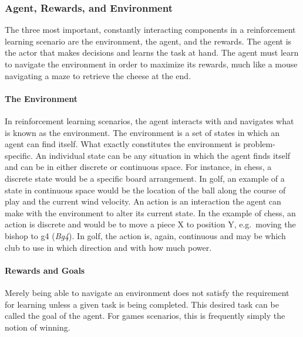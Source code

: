 \subsubsection*{Agent, Rewards, and Environment}


The three most important, constantly interacting components in a reinforcement
learning scenario are
the environment, the agent, and the rewards.
%
The agent is the actor that makes decisions and learns the task at hand.
%
The agent must learn to navigate the environment in order to maximize its
rewards,
much like a mouse navigating a maze to retrieve the cheese at the end.

\paragraph*{The Environment}

In reinforcement learning scenarios,
the agent interacts with and navigates what is known as the environment.
%
The environment is a set of states in which an agent can find itself.
%
What exactly constitutes the environment is problem-specific.
%
An individual state can be any situation in which the agent finds itself
and can be in either discrete or continuous space.
%
For instance, in chess, a discrete state would be a specific board arrangement.
%
In golf, an example of a state in continuous space would be 
the location of the ball along the course of play
and the current wind velocity.
%
An action is an interaction the agent can make with the environment to alter
its current state.
%
In the example of chess,
an action is discrete and would be to move a piece X to position Y,
e.g.\  moving the bishop to g4 (\textit{Bg4}).
%
In golf, the action is, again, continuous and may be
which club to use in which direction and with how much power.

\paragraph*{Rewards and Goals}

Merely being able to navigate an environment does not satisfy the
requirement for learning unless a given task is being completed.
%
This desired task can be called the goal of the agent.
%
For games scenarios,
this is frequently simply the notion of winning.

